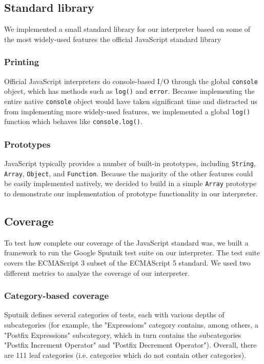 \documentclass{article}
\begin{document}
\subsection*{Standard library}

We implemented a small standard library for our interpreter based on some of the
most widely-used features the official JavaScript standard library

\subsubsection*{Printing}

Official JavaScript interpreters do console-based I/O through the global
\texttt{console} object, which has methods such as \texttt{log()} and
\texttt{error}. Because implementing the entire native \texttt{console} object
would have taken significant time and distracted us from implementing more
widely-used features, we implemented a global \texttt{log()} function which
behaves like \texttt{console.log()}.

\subsubsection*{Prototypes}

JavaScript typically provides a number of built-in prototypes, including
\texttt{String}, \texttt{Array}, \texttt{Object}, and \texttt{Function}. Because
the majority of the other features could be easily implemented natively, we
decided to build in a simple \texttt{Array} prototype to demonstrate our
implementation of prototype functionality in our interpreter.

\subsection*{Coverage}

To test how complete our coverage of the JavaScript standard was, we built a
framework to run the Google Sputnik test
suite\cite{sputnik} on our
interpreter. The test suite covers the ECMAScript 3 subset of the ECMAScript 5
standard. We used two different metrics to analyze the coverage of our
interpreter.

\subsubsection*{Category-based coverage}

Sputnik defines several categories of tests, each with various depths of subcategories
(for example, the "Expressions" category contains, among others, a "Postfix
Expressions" subcategory, which in turn contains the subcategories "Postfix
Increment Operator" and "Postfix Decrement Operator"). Overall, there are 111
leaf categories (i.e. categories which do not contain other categories). \newline
\end{document}
